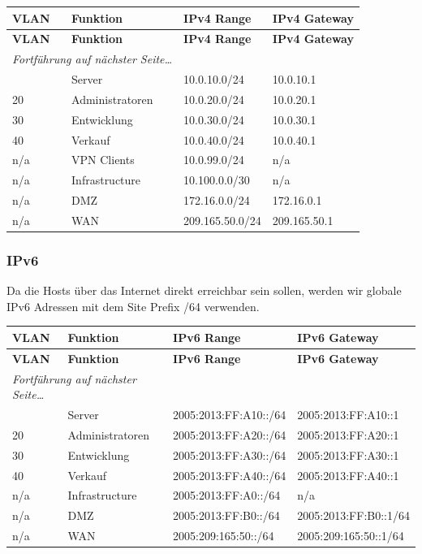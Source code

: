 \documentclass[11pt,a4paper,parskip=half]{scrartcl}
\begin{document}
\begin{longtable}{p{1.5cm}|p{4cm}|p{4cm}|p{3cm}}
	\textbf{VLAN} & \textbf{Funktion} & \textbf{IPv4 Range} & \textbf{IPv4 Gateway}\\
	\hline
	\endfirsthead
	\textbf{VLAN} & \textbf{Funktion} & \textbf{IPv4 Range} & \textbf{IPv4 Gateway}\\
	\hline
	\endhead
	\hline
	\multicolumn{2}{l}{\textit{Fortführung auf nächster Seite\ldots}} \\
	\endfoot
	\endlastfoot
	10 & Server & 10.0.10.0/24 & 10.0.10.1\\
	20 & Administratoren & 10.0.20.0/24 & 10.0.20.1\\
	30 & Entwicklung & 10.0.30.0/24 & 10.0.30.1\\
	40 & Verkauf & 10.0.40.0/24 & 10.0.40.1\\
	n/a & VPN Clients & 10.0.99.0/24 & n/a \\
	n/a & Infrastructure & 10.100.0.0/30 & n/a\\
	n/a & DMZ & 172.16.0.0/24 & 172.16.0.1\\
	n/a & WAN & 209.165.50.0/24 & 209.165.50.1
\end{longtable}

\subsubsection{IPv6}
Da die Hosts über das Internet direkt erreichbar sein sollen, werden wir globale IPv6 Adressen mit dem Site Prefix /64 verwenden.

\begin{longtable}{p{1.5cm}|p{4cm}|p{4cm}|p{4cm}}
	\textbf{VLAN} & \textbf{Funktion} & \textbf{IPv6 Range} & \textbf{IPv6 Gateway}\\
	\hline
	\endfirsthead
	\textbf{VLAN} & \textbf{Funktion} & \textbf{IPv6 Range} & \textbf{IPv6 Gateway}\\
	\hline
	\endhead
	\hline
	\multicolumn{2}{l}{\textit{Fortführung auf nächster Seite\ldots}} \\
	\endfoot
	\endlastfoot
	10 & Server & 2005:2013:FF:A10::/64 & 2005:2013:FF:A10::1\\
	20 & Administratoren & 2005:2013:FF:A20::/64 & 2005:2013:FF:A20::1\\
	30 & Entwicklung & 2005:2013:FF:A30::/64 & 2005:2013:FF:A30::1\\
	40 & Verkauf & 2005:2013:FF:A40::/64 & 2005:2013:FF:A40::1\\
	n/a & Infrastructure & 2005:2013:FF:A0::/64 & n/a\\
	n/a & DMZ & 2005:2013:FF:B0::/64 & 2005:2013:FF:B0::1/64\\
	n/a & WAN & 2005:209:165:50::/64 & 2005:209:165:50::1/64
\end{longtable}
\end{document}
